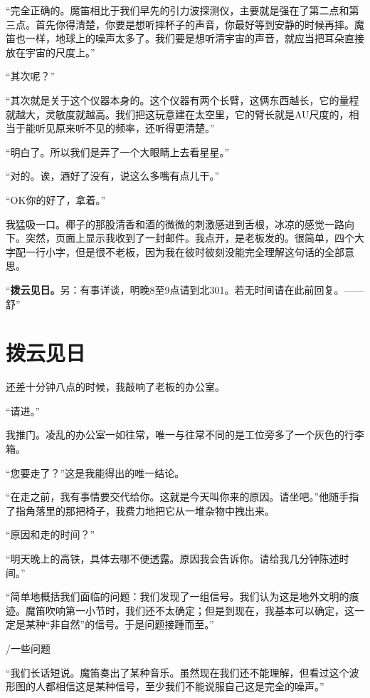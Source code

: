 \documentclass[a4paper, 10pt]{article}
\begin{document}
“完全正确的。魔笛相比于我们早先的引力波探测仪，主要就是强在了第二点和第三点。首先你得清楚，你要是想听摔杯子的声音，你最好等到安静的时候再摔。魔笛也一样，地球上的噪声太多了。我们要是想听清宇宙的声音，就应当把耳朵直接放在宇宙的尺度上。”

“其次呢？”

“其次就是关于这个仪器本身的。这个仪器有两个长臂，这俩东西越长，它的量程就越大，灵敏度就越高。我们把这玩意建在太空里，它的臂长就是AU尺度的，相当于能听见原来听不见的频率，还听得更清楚。”

“明白了。所以我们是弄了一个大眼睛上去看星星。”

“对的。诶，酒好了没有，说这么多嘴有点儿干。”

“OK你的好了，拿着。”

我猛吸一口。椰子的那股清香和酒的微微的刺激感进到舌根，冰凉的感觉一路向下。突然，页面上显示我收到了一封邮件。我点开，是老板发的。很简单，四个大字配一行小字，但是很不老板，因为我在彼时彼刻没能完全理解这句话的全部意思。

“\textbf{拨云见日。}另：有事详谈，明晚8至9点请到北301。若无时间请在此前回复。——舒”

\section{拨云见日}
还差十分钟八点的时候，我敲响了老板的办公室。

“请进。”

我推门。凌乱的办公室一如往常，唯一与往常不同的是工位旁多了一个灰色的行李箱。

“您要走了？”这是我能得出的唯一结论。

“在走之前，我有事情要交代给你。这就是今天叫你来的原因。请坐吧。”他随手指了指角落里的那把椅子，我费力地把它从一堆杂物中拽出来。

“原因和走的时间？”

“明天晚上的高铁，具体去哪不便透露。原因我会告诉你。请给我几分钟陈述时间。”

“简单地概括我们面临的问题：我们发现了一组信号。我们认为这是地外文明的痕迹。魔笛吹响第一小节时，我们还不太确定；但是到现在，我基本可以确定，这一定是某种“非自然”的信号。于是问题接踵而至。”

\vspace{10pt}

/一些问题

\vspace{10pt}

“我们长话短说。魔笛奏出了某种音乐。虽然现在我们还不能理解，但看过这个波形图的人都相信这是某种信号，至少我们不能说服自己这是完全的噪声。”
\end{document}
